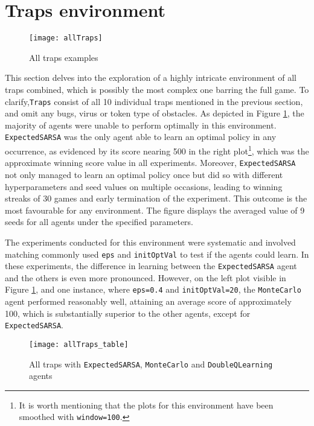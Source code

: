 \section{Traps environment}
\begin{figure}[h]
    \centering
    \texttt{[image: allTraps]}
    \caption{All traps examples}
    \label{fig:alltraps_eg}
\end{figure}

This section delves into the exploration of a highly intricate environment of all traps combined, which is possibly the most complex one barring the full game. To clarify,\texttt{Traps} consist of all 10 individual traps mentioned in the previous section, and omit any bugs, virus or token type of obstacles. As depicted in Figure \ref{fig:alltraps_eg}, the majority of agents were unable to perform optimally in this environment. \texttt{ExpectedSARSA} was the only agent able to learn an optimal policy in any occurrence, as evidenced by its score nearing 500 in the right plot\footnote{It is worth mentioning that the plots for this environment have been smoothed with \texttt{window=100}.}, which was the approximate winning score value in all experiments. Moreover, \texttt{ExpectedSARSA} not only managed to learn an optimal policy once but did so with different hyperparameters and seed values on multiple occasions, leading to winning streaks of 30 games and early termination of the experiment. This outcome is the most favourable for any environment. The figure displays the averaged value of 9 seeds for all agents under the specified parameters. 

The experiments conducted for this environment were systematic and involved matching commonly used \texttt{eps} and \texttt{initOptVal} to test if the agents could learn. In these experiments, the difference in learning between the \texttt{ExpectedSARSA} agent and the others is even more pronounced. However, on the left plot visible in Figure \ref{fig:alltraps_eg}, and one instance, where \texttt{eps=0.4} and \texttt{initOptVal=20}, the \texttt{MonteCarlo} agent performed reasonably well, attaining an average score of approximately 100, which is substantially superior to the other agents, except for \texttt{ExpectedSARSA}.

\begin{figure}[h]
    \centering
    \texttt{[image: allTraps\_table]}
    \caption{All traps with \texttt{ExpectedSARSA}, \texttt{MonteCarlo} and \texttt{DoubleQLearning} agents}
    \label{fig:traps_table_eg}
\end{figure}


